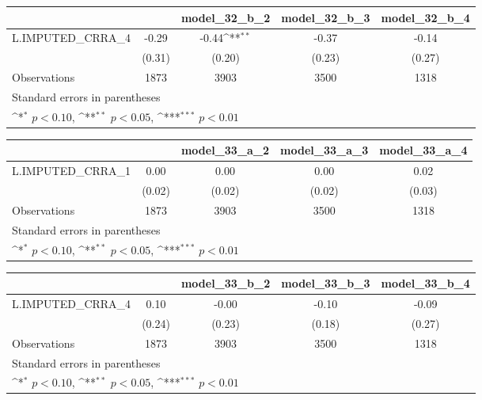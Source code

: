 {
\def\sym#1{\ifmmode^{#1}\else\(^{#1}\)\fi}
\begin{tabular}{l*{4}{c}}
\toprule
                &\multicolumn{1}{c}{}&\multicolumn{1}{c}{model\_32\_b\_2}&\multicolumn{1}{c}{model\_32\_b\_3}&\multicolumn{1}{c}{model\_32\_b\_4}\\
\midrule
L.IMPUTED\_CRRA\_4&    -0.29         &    -0.44\sym{**} &    -0.37         &    -0.14         \\
                &   (0.31)         &   (0.20)         &   (0.23)         &   (0.27)         \\
\midrule
Observations    &     1873         &     3903         &     3500         &     1318         \\
\bottomrule
\multicolumn{5}{l}{\footnotesize Standard errors in parentheses}\\
\multicolumn{5}{l}{\footnotesize \sym{*} \(p<0.10\), \sym{**} \(p<0.05\), \sym{***} \(p<0.01\)}\\
\end{tabular}
}
{
\def\sym#1{\ifmmode^{#1}\else\(^{#1}\)\fi}
\begin{tabular}{l*{4}{c}}
\toprule
                &\multicolumn{1}{c}{}&\multicolumn{1}{c}{model\_33\_a\_2}&\multicolumn{1}{c}{model\_33\_a\_3}&\multicolumn{1}{c}{model\_33\_a\_4}\\
\midrule
L.IMPUTED\_CRRA\_1&     0.00         &     0.00         &     0.00         &     0.02         \\
                &   (0.02)         &   (0.02)         &   (0.02)         &   (0.03)         \\
\midrule
Observations    &     1873         &     3903         &     3500         &     1318         \\
\bottomrule
\multicolumn{5}{l}{\footnotesize Standard errors in parentheses}\\
\multicolumn{5}{l}{\footnotesize \sym{*} \(p<0.10\), \sym{**} \(p<0.05\), \sym{***} \(p<0.01\)}\\
\end{tabular}
}
{
\def\sym#1{\ifmmode^{#1}\else\(^{#1}\)\fi}
\begin{tabular}{l*{4}{c}}
\toprule
                &\multicolumn{1}{c}{}&\multicolumn{1}{c}{model\_33\_b\_2}&\multicolumn{1}{c}{model\_33\_b\_3}&\multicolumn{1}{c}{model\_33\_b\_4}\\
\midrule
L.IMPUTED\_CRRA\_4&     0.10         &    -0.00         &    -0.10         &    -0.09         \\
                &   (0.24)         &   (0.23)         &   (0.18)         &   (0.27)         \\
\midrule
Observations    &     1873         &     3903         &     3500         &     1318         \\
\bottomrule
\multicolumn{5}{l}{\footnotesize Standard errors in parentheses}\\
\multicolumn{5}{l}{\footnotesize \sym{*} \(p<0.10\), \sym{**} \(p<0.05\), \sym{***} \(p<0.01\)}\\
\end{tabular}
}
